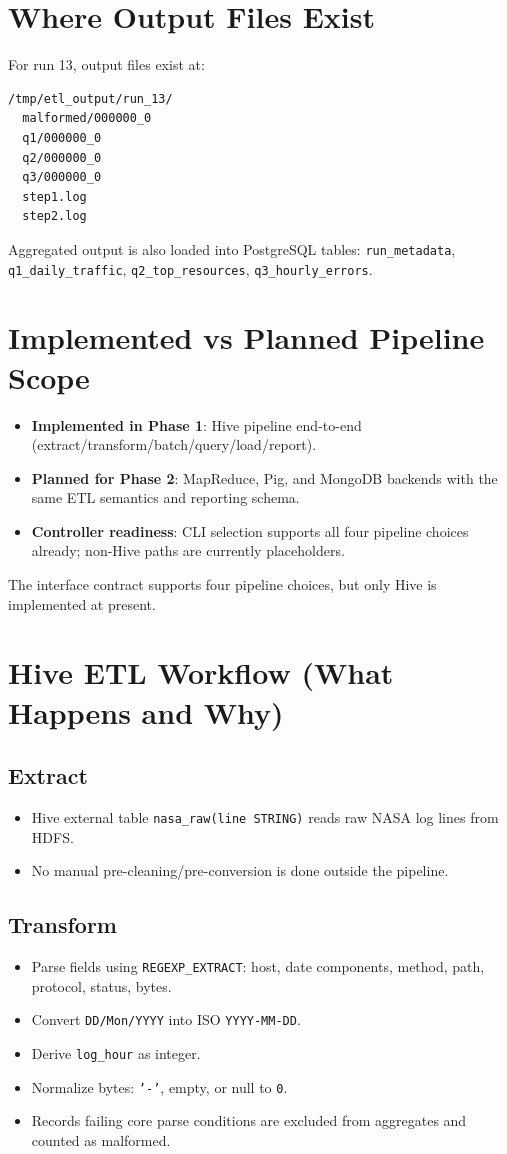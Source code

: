 \documentclass[12pt,a4paper]{article}
\begin{document}
\section{Where Output Files Exist}
For run 13, output files exist at:
\begin{lstlisting}
/tmp/etl_output/run_13/
  malformed/000000_0
  q1/000000_0
  q2/000000_0
  q3/000000_0
  step1.log
  step2.log
\end{lstlisting}
Aggregated output is also loaded into PostgreSQL tables:
\texttt{run\_metadata}, \texttt{q1\_daily\_traffic}, \texttt{q2\_top\_resources}, \texttt{q3\_hourly\_errors}.

\section{Implemented vs Planned Pipeline Scope}
\begin{itemize}
    \item \textbf{Implemented in Phase 1}: Hive pipeline end-to-end (extract/transform/batch/query/load/report).
    \item \textbf{Planned for Phase 2}: MapReduce, Pig, and MongoDB backends with the same ETL semantics and reporting schema.
    \item \textbf{Controller readiness}: CLI selection supports all four pipeline choices already; non-Hive paths are currently placeholders.
\end{itemize}
The interface contract supports four pipeline choices, but only Hive is implemented at present.

\section{Hive ETL Workflow (What Happens and Why)}
\subsection{Extract}
\begin{itemize}
    \item Hive external table \texttt{nasa\_raw(line STRING)} reads raw NASA log lines from HDFS.
    \item No manual pre-cleaning/pre-conversion is done outside the pipeline.
\end{itemize}

\subsection{Transform}
\begin{itemize}
    \item Parse fields using \texttt{REGEXP\_EXTRACT}: host, date components, method, path, protocol, status, bytes.
    \item Convert \texttt{DD/Mon/YYYY} into ISO \texttt{YYYY-MM-DD}.
    \item Derive \texttt{log\_hour} as integer.
    \item Normalize bytes: \texttt{'-'}, empty, or null to \texttt{0}.
    \item Records failing core parse conditions are excluded from aggregates and counted as malformed.
\end{itemize}
\end{document}
